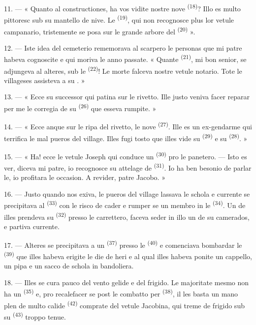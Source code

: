 11. --- « Quanto al constructiones, ha vos vidite nostre nove 
\textsuperscript{(18)}? Illo es multo pittoresc sub su mantello de nive. Le
 \textsuperscript{(19)}, qui non recognosce plus lor vetule
campanario, tristemente se posa sur le grande arbore del 
\textsuperscript{(20)} ».

12. --- Iste idea del cemeterio rememorava al scarpero le personas que mi patre
habeva cognoscite e qui moriva le anno passate. « Quante 
\textsuperscript{(21)}, mi bon senior, se adjungeva al alteres, sub le
 \textsuperscript{(22)}! Le morte falceva nostre vetule
notario. Tote le villageses assisteva a su . »

13. --- « Ecce su successor qui patina sur le rivetto. Ille justo veniva facer
reparar per me le corregia de su  \textsuperscript{(26)} que
esseva rumpite. »

14. --- « Ecce anque sur le ripa del rivetto, le nove 
\textsuperscript{(27)}. Ille es un ex-gendarme qui terrifica le mal pueros del
village. Illes fugi tosto que illes vide su 
\textsuperscript{(29)} e su  \textsuperscript{(28)}. »

15. --- « Ha! ecce le vetule Joseph qui conduce un  \textsuperscript{(30)} pro le panetero. --- Isto es ver, diceva mi patre,
io recognosce su attelage de  \textsuperscript{(31)}. Io ha ben
besonio de parlar le, io profitara le occasion. A revider, patre Jacobo. »

16. --- Justo quando nos exiva, le pueros del village lassava le schola e
currente se precipitava al  \textsuperscript{(33)} con le
risco de cader e rumper se un membro in le 
\textsuperscript{(34)}. Un de illes prendeva su 
\textsuperscript{(32)} presso le carrettero, faceva seder in illo un de su
camerados, e partiva currente.

17. --- Alteres se precipitava a un 
\textsuperscript{(37)} presso le  \textsuperscript{(40)} e
comenciava bombardar le  \textsuperscript{(39)} que illes
habeva erigite le die de heri e al qual illes habeva ponite un cappello, un pipa
e un sacco de schola in bandoliera.

18. --- Illes se cura pauco del vento gelide e del frigido. Le majoritate mesmo
non ha un  \textsuperscript{(35)} e, pro recalefacer se
post le combatto per  \textsuperscript{(38)}, il les
basta un mano plen de multo calide  \textsuperscript{(42)}
comprate del vetule  Jacobina, qui treme de frigido sub su
 \textsuperscript{(43)} troppo tenue.

